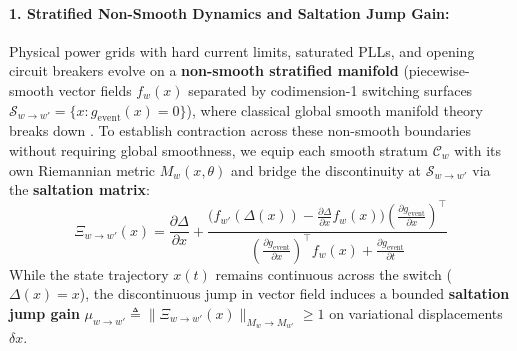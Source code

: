 \documentclass[11pt]{article}
\begin{document}
\paragraph{1. Stratified Non-Smooth Dynamics and Saltation Jump Gain:}
Physical power grids with hard current limits, saturated PLLs, and opening circuit breakers evolve on a \textbf{non-smooth stratified manifold} (piecewise-smooth vector fields $f_w(x)$ separated by codimension-1 switching surfaces $\mathcal{S}_{w \to w'} = \{x : g_{\mathrm{event}}(x) = 0\}$), where classical global smooth manifold theory breaks down \cite{Borquez2026}. To establish contraction across these non-smooth boundaries without requiring global smoothness, we equip each smooth stratum $\mathcal{C}_w$ with its own Riemannian metric $M_w(x, \theta)$ and bridge the discontinuity at $\mathcal{S}_{w \to w'}$ via the \textbf{saltation matrix}:
\begin{equation}
\Xi_{w \to w'}(x) = \frac{\partial \Delta}{\partial x} + \frac{\Big( f_{w'}(\Delta(x)) - \frac{\partial \Delta}{\partial x} f_w(x) \Big) \left( \frac{\partial g_{\mathrm{event}}}{\partial x} \right)^\top}{\left( \frac{\partial g_{\mathrm{event}}}{\partial x} \right)^\top f_w(x) + \frac{\partial g_{\mathrm{event}}}{\partial t}} \label{eq:saltation_jump}
\end{equation}
While the state trajectory $x(t)$ remains continuous across the switch ($\Delta(x) = x$), the discontinuous jump in vector field induces a bounded \textbf{saltation jump gain} $\mu_{w \to w'} \triangleq \|\Xi_{w \to w'}(x)\|_{M_w \to M_{w'}} \ge 1$ on variational displacements $\delta x$.
\end{document}
